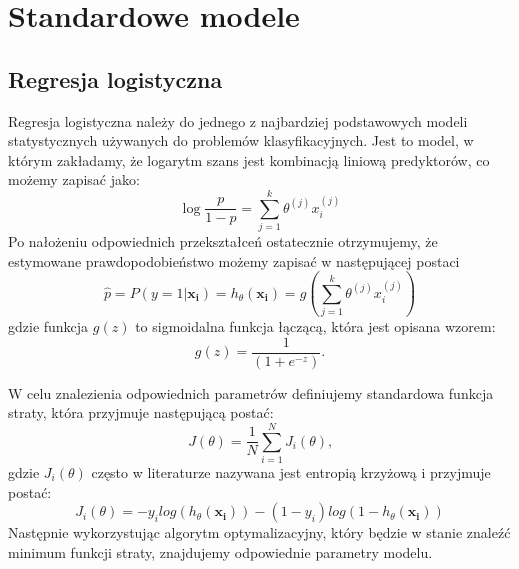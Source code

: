 \documentclass{book}
\begin{document}

\section{Standardowe modele}


\subsection{Regresja logistyczna}
\label{reg-log}
	Regresja logistyczna należy do jednego z najbardziej podstawowych modeli statystycznych używanych do problemów klasyfikacyjnych. Jest to model, w którym zakładamy, że logarytm szans jest kombinacją liniową predyktorów, co możemy zapisać jako:
	$$ \log{\frac{p}{1 - p}} = \sum_{j=1}^k \theta^{(j)}x_i^{(j)} $$
	Po nałożeniu odpowiednich przekształceń ostatecznie otrzymujemy, że estymowane prawdopodobieństwo możemy zapisać w następującej postaci
	\begin{equation}
		\hat{p} = P(y=1|\boldsymbol{x_i}) = h_{\theta}(\boldsymbol{x_i}) = g\left(\sum_{j=1}^k \theta^{(j)}x_i^{(j)} \right)
	\end{equation} 
	gdzie funkcja $g(z)$ to sigmoidalna funkcja łączącą, która jest opisana wzorem: 
	$$ g(z) = \frac{1}{(1+e^{-z})} \text{.}$$
	
	W celu znalezienia odpowiednich parametrów definiujemy standardowa funkcja straty, która przyjmuje następującą postać:
	$$ J(\theta) = \frac{1}{N} \sum_{i=1}^N J_i(\theta) \text{,}$$
	gdzie $J_i(\theta)$ często w literaturze nazywana jest entropią krzyżową i przyjmuje postać:
	\begin{equation}
	\label{c-e}
		J_i(\theta) = -y_i log(h_{\theta}(\boldsymbol{x_i})) - (1-y_i) log(1 - h_{\theta}(\boldsymbol{x_i}))
	\end{equation}
	Następnie wykorzystując algorytm optymalizacyjny, który będzie w stanie znaleźć minimum funkcji straty, znajdujemy odpowiednie parametry modelu.
	
\end{document}
